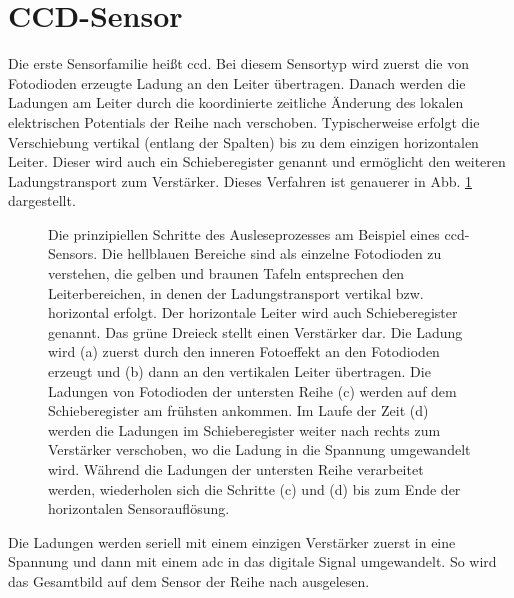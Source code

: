 \section{CCD-Sensor}
\label{text:ccd_theorie}
Die erste Sensorfamilie heißt \gls{ccd}. Bei diesem Sensortyp wird zuerst die von Fotodioden erzeugte Ladung an den Leiter übertragen. Danach werden die Ladungen am Leiter durch die koordinierte zeitliche Änderung des lokalen elektrischen Potentials der Reihe nach verschoben. Typischerweise erfolgt die Verschiebung vertikal (entlang der Spalten) bis zu dem einzigen horizontalen Leiter. Dieser wird auch ein Schieberegister genannt und ermöglicht den weiteren Ladungstransport zum Verstärker. Dieses Verfahren ist genauerer in Abb. \ref{fig:ccd_scheme} dargestellt.
\begin{figure}[H]
    
    \caption{Die prinzipiellen Schritte des Ausleseprozesses am Beispiel eines  \gls{ccd}-Sensors. Die hellblauen Bereiche sind als einzelne Fotodioden zu verstehen, die gelben und braunen Tafeln entsprechen den Leiterbereichen, in denen der Ladungstransport vertikal bzw. horizontal erfolgt. Der horizontale Leiter wird auch Schieberegister genannt. Das grüne Dreieck stellt einen Verstärker dar. Die Ladung wird (a) zuerst durch den inneren Fotoeffekt an den Fotodioden erzeugt und (b) dann an den vertikalen Leiter übertragen. Die Ladungen von Fotodioden der untersten Reihe (c) werden auf dem Schieberegister am frühsten ankommen. Im Laufe der Zeit (d) werden die Ladungen im Schieberegister weiter nach rechts zum Verstärker verschoben, wo die Ladung in die Spannung umgewandelt wird. Während die Ladungen der untersten Reihe verarbeitet werden, wiederholen sich die Schritte (c) und (d) bis zum Ende der horizontalen Sensorauflösung.}
    \label{fig:ccd_scheme}
\end{figure}
\noindent
Die Ladungen werden seriell mit einem einzigen Verstärker zuerst in eine Spannung und dann mit einem \gls{adc} in das digitale Signal umgewandelt. So wird das Gesamtbild auf dem Sensor der Reihe nach ausgelesen.


